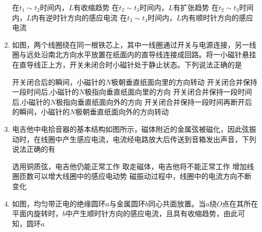 \begin{enumerate}
\fourchoices
{在$ t_1 \sim t_2 $时间内，$ L $有收缩趋势}
{在$ t_2 \sim t_3 $时间内，$ L $有扩张趋势}
{在$ t_2 \sim t_3 $时间内，$ L $内有逆时针方向的感应电流}
{在$ t_3 \sim t_4 $时间内，$ L $内有顺时针方向的感应电流}



\item 
{}
如图，两个线圈绕在同一根铁芯上，其中一线圈通过开关与电源连接，另一线圈与远处沿南北方向水平放置在纸面内的直导线连接成回路。将一小磁针悬挂在直导线正上方，开关未闭合时小磁针处于静止状态。下列说法正确的是  
\begin{figure}[h!]
\centering

\end{figure}


\fourchoices
{开关闭合后的瞬间，小磁针的$ N $极朝垂直纸面向里的方向转动}
{开关闭合并保持一段时间后,小磁针的$ N $极指向垂直纸面向里的方向}
{开关闭合并保持一段时间后,小磁针的$ N $极指向垂直纸面向外的方向}
{开关闭合并保持一段时间再断开后的瞬间，小磁针的$ N $极朝垂直纸面向外的方向转动}


\item 
{}
电吉他中电拾音器的基本结构如图所示，磁体附近的金属弦被磁化，因此弦振动时，在线圈中产生感应电流，电流经电路放大后传送到音箱发出声音，下列说法正确的有  


\begin{minipage}[h!]{0.7\linewidth}
\vspace{0.3em}
\fourchoices
{选用铜质弦，电吉他仍能正常工作}
{取走磁体，电吉他将不能正常工作}
{增加线圈匝数可以增大线圈中的感应电动势}
{磁振动过程中，线圈中的电流方向不断变化}

\vspace{0.3em}
\end{minipage}
\hfill
\begin{minipage}[h!]{0.3\linewidth}
\flushright
\vspace{0.3em}

\vspace{0.3em}
\end{minipage}




\newpage
\item 
{}
如图，均匀带正电的绝缘圆环$ a $与金属圆环$ b $同心共面放置。当$ a $绕$ O $点在其所在平面内旋转时，$ b $中产生顺时针方向的感应电流，且具有收缩趋势，由此可知，圆环$ a $  

\begin{figure}[h!]
\centering

\end{figure}



\end{enumerate}
